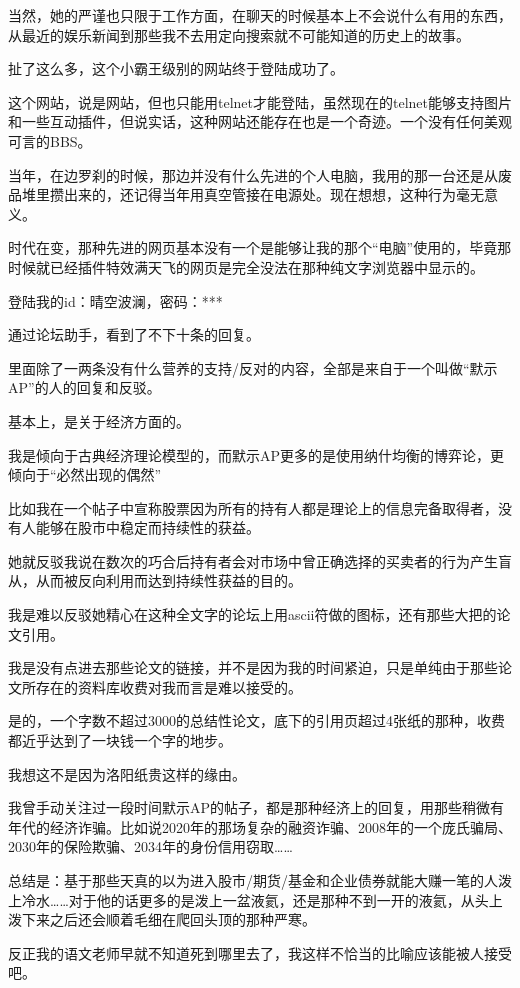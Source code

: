 当然，她的严谨也只限于工作方面，在聊天的时候基本上不会说什么有用的东西，从最近的娱乐新闻到那些我不去用定向搜索就不可能知道的历史上的故事。

扯了这么多，这个小霸王级别的网站终于登陆成功了。

这个网站，说是网站，但也只能用telnet才能登陆，虽然现在的telnet能够支持图片和一些互动插件，但说实话，这种网站还能存在也是一个奇迹。一个没有任何美观可言的BBS。

当年，在边罗刹的时候，那边并没有什么先进的个人电脑，我用的那一台还是从废品堆里攒出来的，还记得当年用真空管接在电源处。现在想想，这种行为毫无意义。

时代在变，那种先进的网页基本没有一个是能够让我的那个“电脑”使用的，毕竟那时候就已经插件特效满天飞的网页是完全没法在那种纯文字浏览器中显示的。

登陆我的id：晴空波澜，密码：***

通过论坛助手，看到了不下十条的回复。

里面除了一两条没有什么营养的支持/反对的内容，全部是来自于一个叫做“默示AP”的人的回复和反驳。

基本上，是关于经济方面的。

我是倾向于古典经济理论模型的，而默示AP更多的是使用纳什均衡的博弈论，更倾向于“必然出现的偶然”

比如我在一个帖子中宣称股票因为所有的持有人都是理论上的信息完备取得者，没有人能够在股市中稳定而持续性的获益。

她就反驳我说在数次的巧合后持有者会对市场中曾正确选择的买卖者的行为产生盲从，从而被反向利用而达到持续性获益的目的。

我是难以反驳她精心在这种全文字的论坛上用ascii符做的图标，还有那些大把的论文引用。

我是没有点进去那些论文的链接，并不是因为我的时间紧迫，只是单纯由于那些论文所存在的资料库收费对我而言是难以接受的。

是的，一个字数不超过3000的总结性论文，底下的引用页超过4张纸的那种，收费都近乎达到了一块钱一个字的地步。

我想这不是因为洛阳纸贵这样的缘由。

我曾手动关注过一段时间默示AP的帖子，都是那种经济上的回复，用那些稍微有年代的经济诈骗。比如说2020年的那场复杂的融资诈骗、2008年的一个庞氏骗局、2030年的保险欺骗、2034年的身份信用窃取……

总结是：基于那些天真的以为进入股市/期货/基金和企业债券就能大赚一笔的人泼上冷水……对于他的话更多的是泼上一盆液氦，还是那种不到一开的液氦，从头上泼下来之后还会顺着毛细在爬回头顶的那种严寒。

反正我的语文老师早就不知道死到哪里去了，我这样不恰当的比喻应该能被人接受吧。

